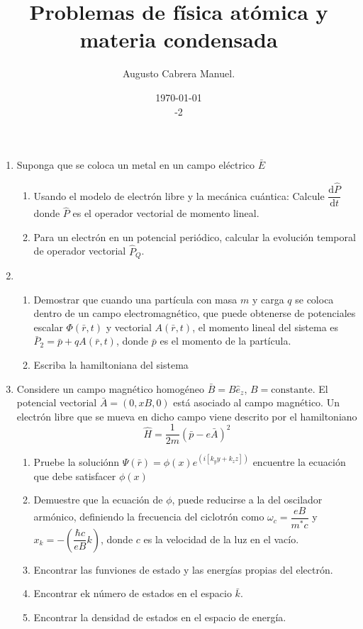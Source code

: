 \documentclass[]{article}
\title{Problemas de física atómica y materia condensada}
\author{Augusto Cabrera Manuel.}
\date{\today\\ \ser 9 \sem 2018-2 }
\begin{document}
\maketitle

\begin{enumerate}
\item Suponga que se coloca un metal en un campo eléctrico $\bar{E}$
  \begin{enumerate}
  \item Usando el modelo de electrón libre y la mecánica cuántica: Calcule $\dfrac{\mathrm{d}\hat{P}}{\mathrm{d}t}$ donde $\hat{P}$ es el operador vectorial de momento lineal.
    \item Para un electrón en un potencial periódico, calcular la evolución temporal de operador vectorial $\hat{P}_Q$.
  \end{enumerate}
\item  \begin{enumerate}
\item Demostrar que cuando una partícula con masa $m$ y carga $q$ se coloca dentro de un campo electromagnético, que puede obtenerse de potenciales escalar $\Phi(\bar{r},t)$ y vectorial $A(\bar{r},t)$, el momento lineal del sistema es $\bar{P}_2=\bar{p}+qA(\bar{r},t)$, donde $\bar{p}$ es el momento de la partícula.
\item Escriba la hamiltoniana del sistema  
\end{enumerate}
\item Considere un campo magnético homogéneo $\bar{B}=B\hat{e}_z$,  $B=\text{constante}$. El potencial vectorial $\bar{A}=(0,xB,0)$ está asociado al campo magnético. Un electrón libre que se mueva en dicho campo viene descrito por el hamiltoniano
  $$
\hat{H}=\dfrac{1}{2m}\left(\bar{p}-e\bar{A}\right)^2
$$
\begin{enumerate}
\item Pruebe la soluciónn $\Psi(\bar{r})=\phi(x)e^{(i[k_y y+k_z z])}$ encuentre la ecuación que debe satisfacer $\phi(x)$
\item Demuestre que la ecuación de $\phi$, puede reducirse a la del oscilador armónico, definiendo la frecuencia del ciclotrón como $\omega_c=\dfrac{eB}{m^*c}$ y $x_k=-\left(\dfrac{\hbar c}{eB}k\right)$, donde $c$  es la velocidad de la luz en el vacío.
\item Encontrar las funviones de estado y las energías propias del electrón.
\item Encontrar ek número de estados  en el espacio $\bar{k}$.
\item Encontrar la densidad de estados en el espacio de energía.

\end{enumerate}
\end{enumerate}
\end{document}

